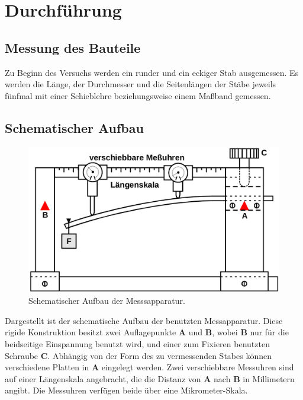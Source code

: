 \section{Durchführung} \label{sec:durchführung}

\subsection{Messung des Bauteile} \label{sec:bauteile}

    Zu Beginn des Versuchs werden ein runder und ein eckiger Stab ausgemessen.
    Es werden die Länge, der Durchmesser und die Seitenlängen der Stäbe jeweils fünfmal mit
    einer Schieblehre beziehungsweise einem Maßband gemessen.

\subsection{Schematischer Aufbau}

\begin{figure}
  \centering
  \includegraphics[width=\textwidth]{content/img/aufbau.png}
  \caption{Schematischer Aufbau der Messsapparatur. \cite{img_aufbau}}
  \label{fig:aufbau}
\end{figure}

Dargestellt ist der schematische Aufbau der benutzten Messapparatur.
Diese rigide Konstruktion besitzt zwei Auflagepunkte \textbf{A} und \textbf{B},
wobei \textbf{B} nur für die beidseitige Einspannung benutzt wird,
und einer zum Fixieren benutzten Schraube \textbf{C}.
Abhängig von der Form des zu vermessenden Stabes können verschiedene Platten in \textbf{A} eingelegt werden.
Zwei verschiebbare Messuhren sind auf einer Längenskala angebracht, die die Distanz von \textbf{A} nach \textbf{B} in Millimetern angibt. Die Messuhren verfügen beide über eine Mikrometer-Skala.

